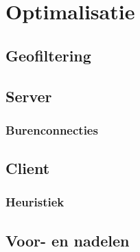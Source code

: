 \chapter{Optimalisatie}

\section{Geofiltering}

\section{Server}

\subsection{Burenconnecties}

\section{Client}

\subsection{Heuristiek}

\section{Voor- en nadelen}